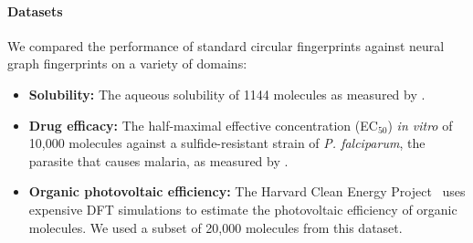 \documentclass{article}
\newcommand{\citet}{\cite}
\begin{document}
\paragraph{Datasets}
We compared the performance of standard circular fingerprints against neural graph fingerprints on a variety of domains:
%
\begin{itemize}
\item {\bf Solubility:} The aqueous solubility of 1144 molecules as measured by \cite{delaney_data_2004}.
\item{\bf Drug efficacy:} The half-maximal effective concentration (EC$_{50}$) {\it in vitro} of 10,000 molecules against a sulfide-resistant strain of {\it P. falciparum}, the parasite that causes malaria, as measured by \citet{gamo2010thousands}.
\item {\bf Organic photovoltaic efficiency:} The Harvard Clean Energy Project~\citet{hachmann2011harvard} uses expensive DFT simulations to estimate the photovoltaic efficiency of organic molecules.
We used a subset of 20,000 molecules from this dataset.
\end{itemize}
\end{document}
